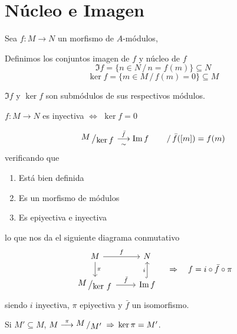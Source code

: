 \section{N\'ucleo e Imagen}
Sea $f: M\longrightarrow N$ un morfismo de $A$-m\'odulos, 
\begin{defi} Definimos los conjuntos imagen de $f$ y n\'ucleo de $f$
    $$\Im f = \{ n\in N \, / \, n =f(m) \} \subseteq N$$
    $$ \ker f = \{ m\in M \, / \, f(m) = 0\} \subseteq M$$
\end{defi}
\begin{prop}
   $\Im f$ y $\ker f$ son subm\'odulos de sus respectivos m\'odulos. 
\end{prop}
\begin{prop}
    $f: M \longrightarrow N$ es inyectiva $\iff$ $\ker f = 0$
\end{prop}
\begin{teo}[de factorizaci\'on]
    $$\modulo{M}{\ker f} \underset{\sim}{\overset{\bar f }{\longrightarrow}} \Im f \qquad \, / \,  \bar f([m]) = f(m)$$
    verificando que  \vspace{-3mm}
    \begin{enumerate}
        \item Est\'a bien definida
        \item Es un morfismo de m\'odulos
        \item Es epiyectiva e inyectiva
    \end{enumerate}
    lo que nos da el siguiente diagrama conmutativo
    $$\bt 
    M \arrow{r}{f} \arrow{d}{\pi} & N \\
    \modulo{M}{\ker\, f} \arrow{r}{\bar f} & \Im f \arrow[hook]{u}{i} 
    \et \quad \Rightarrow \quad f = i \circ \bar f \circ \pi $$
    siendo $i$ inyectiva, $\pi$ epiyectiva y $\bar f$ un isomorfismo.
\end{teo}
\begin{prop}
    Si $M' \subseteq M$, $M \overset{\pi}{\longrightarrow} \modulo{M}{M'} \, \Rightarrow \, \ker \pi = M'$.
\end{prop}
